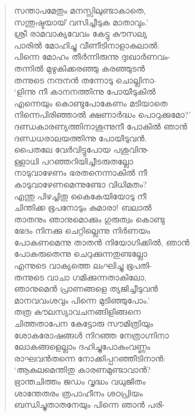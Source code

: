 \begin{verse}
സന്താപമേതും മനസ്സിലുണ്ടാകാതെ,\\
സന്തുഷ്ടയായ് വസിച്ചീടുക മാതാവും.’\\
ശ്രീ രാമവാക്യവേവം കേട്ടു കൗസല്യ\\
പാരില്‍ മോഹിച്ചു വീണീടിനാളാകുലാല്‍.\\
പിന്നെ മോഹം തീര്‍ന്നിരുന്നു ദുഃഖാര്‍ണവം-\\
തന്നില്‍ മുഴുകിക്കരഞ്ഞു കരഞ്ഞുടന്‍\\
തന്നുടെ നന്ദനന്‍ തന്നോടു ചൊല്ലിനാ-\\
‘ളിന്നു നീ കാനനത്തിന്നു പോയീടുകില്‍\\
എന്നെയും കൊണ്ടുപോകേണം മടിയാതെ\\
നിന്നെപിരിഞ്ഞാല്‍ ക്ഷണാര്‍ദ്ധം പൊറുക്കുമോ?’\\
ദണ്ഡകാരണ്യത്തിനാശുന്നുനീ പോകില്‍ ഞാന്‍\\
ദണ്ഡധരാലയത്തിന്നു പോയീടുവന്‍.\\
പൈതലേ വേര്‍വിട്ടുപോയ പശുവിനു-\\
ള്ളാധി പറഞ്ഞറിയിച്ചീടരുതല്ലോ\\
നാടുവാഴേണം ഭരതനെന്നാകില്‍ നീ\\
കാടുവാഴേണമെന്നുണ്ടോ വിധിമതം?\\
എന്തു പിഴച്ചിതു കൈകേയിയോടു നീ\\
ചിന്തിക്ക ഭൂപനോടും കുമാരാ! ബലാല്‍\\
താതനും ഞാനുമൊക്കും ഗുരുത്വം കൊണ്ടു\\
ഭേദം നിനക്കു ചെറ്റില്ലെന്നു നിര്‍ണയം\\
പോകണമെന്നു താതന്‍ നിയോഗിക്കില്‍, ഞാന്‍\\
പോകരുതെന്നു ചെറുക്കുന്നതുണ്ടല്ലോ\\
എന്നുടെ വാക്യത്തെ ലംഘിച്ചു ഭൂപതി-\\
തന്നുടെ വാചാ ഗമിക്കുന്നതാകിലോ,\\
ഞാനുമെന്‍ പ്രാണങ്ങളെ ത്യജിച്ചീടുവന്‍\\
മാനവവംശവും പിന്നെ മുടിഞ്ഞുപോം.’\\
തത്ര കൗലസ്യാവചനങ്ങിളിങ്ങനെ\\
ചിത്തതാപേന കേട്ടോരു സൗമിത്രിയും\\
ശോകരോഷങ്ങള്‍ നിറഞ്ഞ നേത്രാഗ്നിനാ\\
ലോകങ്ങളെല്ലാം ദഹിച്ചുപോകുംവണ്ണം\\
രാഘവന്‍തന്നെ നോക്കിപ്പറഞ്ഞീടിനാന്‍:\\
‘ആകുലമെന്തിതു കാരണമുണ്ടാവാന്‍?\\
ഭ്രാന്തചിത്തം ജഡം വൃദ്ധം വധുജിതം\\
ശാന്തേതരം ത്രപാഹീനം ശഠപ്രിയം\\
ബന്ധിച്ചുതാതനേയും പിന്നെ ഞാന്‍ പരി-\\

\end{verse}
